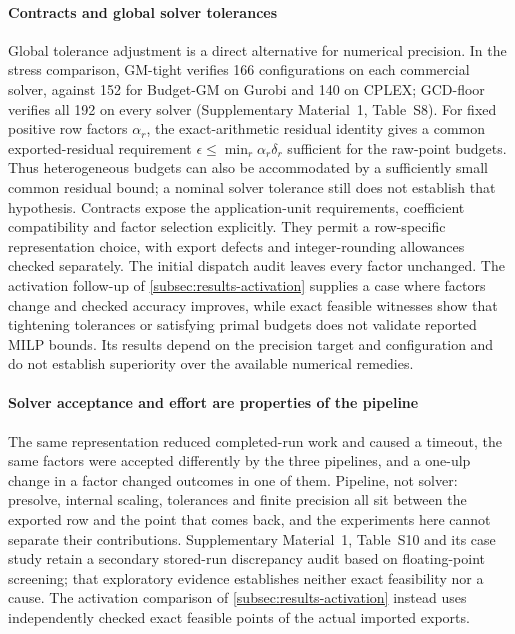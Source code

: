 \documentclass[11pt]{article}
\theoremstyle{definition}
\theoremstyle{remark}
\begin{document}
\paragraph{Contracts and global solver tolerances}
Global tolerance adjustment is a direct alternative for numerical precision. In the stress
comparison, GM-tight verifies 166 configurations on each commercial solver, against 152
for Budget-GM on Gurobi and 140 on CPLEX; GCD-floor verifies all 192 on every solver
(Supplementary Material~1, Table~S8). For fixed positive row factors $\alpha_r$, the
exact-arithmetic residual identity gives a common exported-residual requirement
$\epsilon\le\min_r\alpha_r\delta_r$ sufficient for the raw-point budgets. Thus
heterogeneous budgets can also be accommodated by a sufficiently small common residual
bound; a nominal solver tolerance still does not establish that hypothesis.
Contracts expose the application-unit requirements, coefficient compatibility and factor
selection explicitly. They permit a row-specific representation choice, with export defects
and integer-rounding allowances checked separately. The initial dispatch audit leaves every
factor unchanged. The activation follow-up of \cref{subsec:results-activation} supplies a
case where factors change and checked accuracy improves, while exact feasible witnesses
show that tightening tolerances or satisfying primal budgets does not validate reported
MILP bounds. Its results depend on the precision target and configuration and do not
establish superiority over the available numerical remedies.

\paragraph{Solver acceptance and effort are properties of the pipeline} The same
representation reduced completed-run work and caused a timeout, the same factors were accepted
differently by the three pipelines, and a one-ulp change in a factor changed outcomes in one of
them. Pipeline, not solver: presolve, internal scaling, tolerances and finite precision all sit
between the exported row and the point that comes back, and the experiments here cannot
separate their contributions. Supplementary Material~1, Table~S10 and its case study
retain a secondary stored-run discrepancy audit based on floating-point screening;
that exploratory evidence establishes neither exact feasibility nor a cause.
The activation comparison of \cref{subsec:results-activation} instead uses independently
checked exact feasible points of the actual imported exports.
\end{document}

